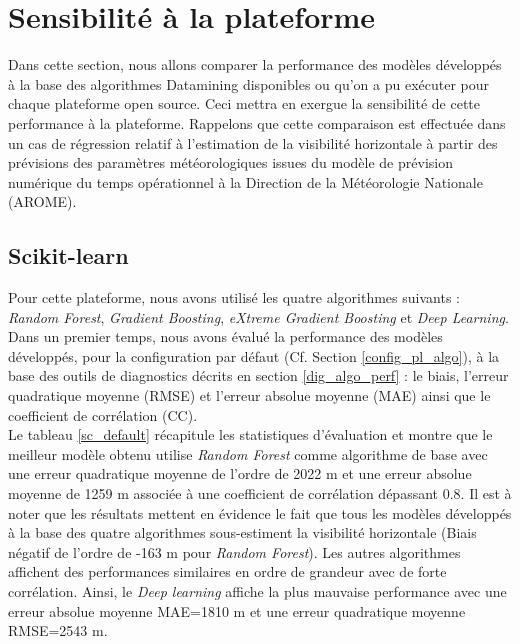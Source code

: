 \section{Sensibilité à la plateforme}
Dans cette section, nous allons comparer la performance des modèles développés à la base des algorithmes Datamining disponibles ou qu'on a pu exécuter pour chaque plateforme open source. Ceci mettra en exergue la sensibilité de cette performance à la plateforme. Rappelons que cette comparaison est effectuée dans un cas de régression relatif à l'estimation de la visibilité horizontale à partir des prévisions des paramètres météorologiques issues du modèle de prévision numérique du temps opérationnel à la Direction de la Météorologie Nationale (AROME).\\

\subsection*{Scikit-learn}
Pour cette plateforme, nous avons utilisé les quatre algorithmes suivants : \textit{Random Forest}, \textit{Gradient Boosting}, \textit{eXtreme Gradient Boosting} et \textit{Deep Learning}. Dans un premier temps, nous avons évalué la performance des modèles développés, pour la configuration par défaut (Cf. Section \ref{config_pl_algo}), à la base des outils de diagnostics décrits en section \ref{dig_algo_perf} : le biais, l'erreur quadratique moyenne (RMSE) et l'erreur absolue moyenne (MAE) ainsi que le coefficient de corrélation (CC).\\ 

Le tableau \ref{sc_default} récapitule les statistiques d'évaluation et 
montre que le meilleur modèle obtenu utilise \textit{Random Forest} comme algorithme de base avec une erreur quadratique moyenne de l'ordre de 2022 m et une erreur absolue moyenne de 1259 m associée à une coefficient de corrélation dépassant 0.8. Il est à noter que les résultats mettent en évidence le fait que tous les modèles développés à la base des quatre algorithmes sous-estiment la visibilité horizontale (Biais négatif de l'ordre de -163 m pour \textit{Random Forest}). Les autres algorithmes affichent des performances similaires en ordre de grandeur avec de forte corrélation. Ainsi, le \textit{Deep learning} affiche la plus mauvaise performance avec une erreur absolue moyenne MAE=1810 m et une erreur quadratique moyenne RMSE=2543 m. \\ 

